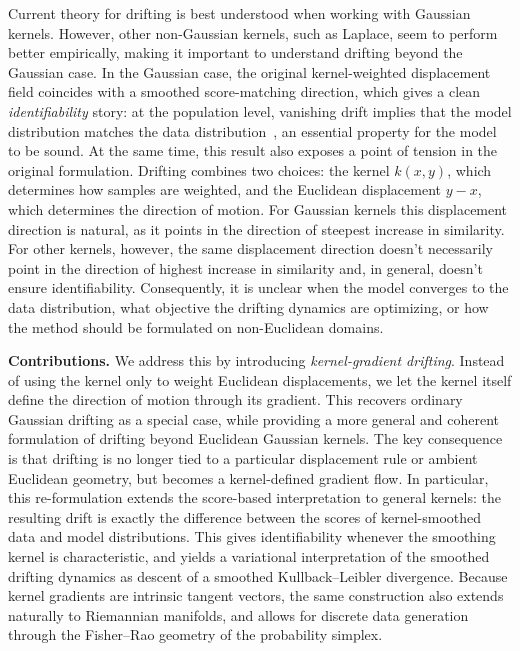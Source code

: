 \documentclass{article}
\theoremstyle{plain}
\begin{document}


Current theory for drifting is best understood when working with Gaussian kernels. However, other non-Gaussian kernels, such as Laplace, seem to perform better empirically, making it important to understand drifting beyond the Gaussian case. In the Gaussian case, the original kernel-weighted displacement field coincides with a smoothed score-matching direction, which gives a clean \textit{identifiability} story: at the population level, vanishing drift implies that the model distribution matches the data distribution~\citep{Lai_2026_Unified,Turan_2026_Drifting}, an essential property for the model to be sound. At the same time, this result also exposes a point of tension in the original formulation. Drifting combines two choices: the kernel \(k(x,y)\), which determines how samples are weighted, and the Euclidean displacement \(y-x\), which determines the direction of motion. For Gaussian kernels this displacement direction is natural, as it points in the direction of steepest increase in similarity. For other kernels, however, the same displacement direction doesn't necessarily point in the direction of highest increase in similarity and, in general, doesn't ensure identifiability.  Consequently, it is  unclear when the model converges to the data distribution, what objective the drifting dynamics are optimizing, or how the method should be formulated on non-Euclidean domains.

\textbf{Contributions.} We address this by introducing \emph{kernel-gradient drifting}. Instead of using the kernel only to weight Euclidean displacements, we let the kernel itself define the direction of motion through its gradient. This recovers ordinary Gaussian drifting as a special case, while providing a more general and coherent formulation of drifting beyond Euclidean Gaussian kernels. The key consequence is that drifting is no longer tied to a particular displacement rule or ambient Euclidean geometry, but becomes a kernel-defined gradient flow. In particular, this re-formulation  extends the score-based interpretation to general kernels: the resulting drift is exactly the difference between the scores of kernel-smoothed data and model distributions. This gives identifiability whenever the smoothing kernel is characteristic, and yields a variational interpretation of the smoothed drifting dynamics as descent of a smoothed Kullback--Leibler divergence. Because kernel gradients are intrinsic tangent vectors, the same construction also extends naturally to Riemannian manifolds, and allows for discrete data generation through the Fisher--Rao geometry of the probability simplex. 
\end{document}
